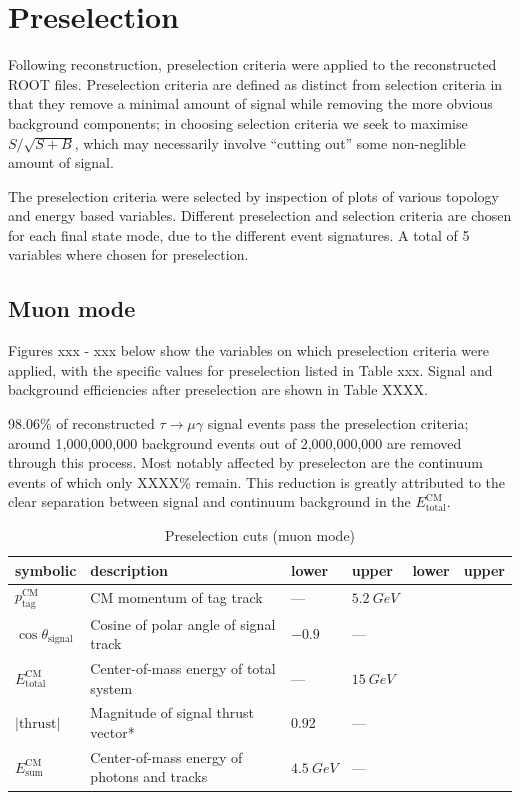 \documentclass[12pt]{thesis}  %
\begin{document}
\pagebreak


\chapter{Preselection}

Following reconstruction, preselection criteria were applied to the reconstructed ROOT files. Preselection criteria are defined as distinct from selection criteria in that they remove a minimal amount of signal while removing the more obvious background components; in choosing selection criteria we seek to maximise $S/\sqrt{S+B}$, which may necessarily involve ``cutting out'' some non-neglible amount of signal.

The preselection criteria were selected by inspection of plots of various topology and energy based variables. Different preselection and selection criteria are chosen for each final state mode, due to the different event signatures. A total of 5 variables where chosen for preselection.

\section{Muon mode}

Figures xxx - xxx below show the variables on which preselection criteria were applied, with the specific values for preselection listed in Table xxx. Signal and background efficiencies after preselection are shown in Table XXXX.

98.06\% of reconstructed $\tau\to\mu\gamma$ signal events pass the preselection criteria; around 1,000,000,000 background events out of 2,000,000,000 are removed through this process. Most notably affected by preselecton are the continuum events of which only XXXX\% remain. This reduction is greatly attributed to the clear separation between signal and continuum background in the $E^{\text{CM}}_{\text{total}}$.

\begin{table}[h]
\centering
\begin{tabular}{llllll}
\textbf{symbolic} & \textbf{description} & \cellcolor[HTML]{EFEFEF} \textbf{lower} & \cellcolor[HTML]{EFEFEF} \textbf{upper} & 
\cellcolor[HTML]{C0C0C0} \textbf{lower} & \cellcolor[HTML]{C0C0C0} \textbf{upper}  \\ \hline
$p_{\text{tag}}^{\text{CM}}$  & CM momentum of tag track & --- & $\SI{5.2}{GeV}$ \\
$\cos\theta_{\text{signal}}$ & Cosine of polar angle of signal track & $-0.9$ & --- \\
$E_{\text{total}}^{\text{CM}}$ & Center-of-mass energy of total system  & --- & $\SI{15}{GeV}$ \\
$\lvert\text{thrust}\rvert$ & Magnitude of signal thrust vector* & 0.92 & --- \\
$E_{\text{sum}}^{\text{CM}}$ & Center-of-mass energy of photons and tracks & $\SI{4.5}{GeV}$ & ---
\end{tabular}
\caption{Preselection cuts (muon mode)}
\label{my-label}
\end{table}
\end{document}
